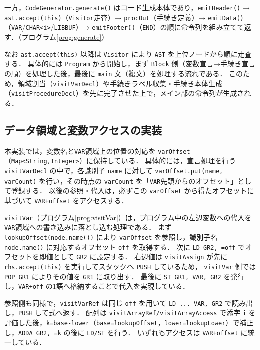 \documentclass[a4j,10pt]{jarticle}
\begin{document}
一方，\verb|CodeGenerator.generate()| はコード生成本体であり，\verb|emitHeader()| → \verb|ast.accept(this)|（\verb|Visitor|走査）→ \verb|procOut|（手続き定義）→ \verb|emitData()|（\texttt{VAR}/\texttt{CHAR<i>}/\texttt{LIBBUF}）→ \verb|emitFooter()|（\verb|END|）の順に命令列を組み立てて返す．（プログラム\ref{prog:generate}）

なお \verb|ast.accept(this)| 以降は \verb|Visitor| により \verb|AST| を上位ノードから順に走査する．
具体的には \verb|Program| から開始し，まず \verb|Block| 側（変数宣言→手続き宣言の順）を処理した後，最後に \verb|main| 文（複文）を処理する流れである．
このため，領域割当（\verb|visitVarDecl|）や手続きラベル収集・手続き本体生成（\verb|visitProcedureDecl|）を先に完了させた上で，メイン部の命令列が生成される．





\subsection{データ領域と変数アクセスの実装}
本実装では，変数名と\texttt{VAR}領域上の位置の対応を \verb|varOffset|（\verb|Map<String,Integer>|）に保持している．
具体的には，宣言処理を行う \verb|visitVarDecl| の中で，各識別子 \verb|name| に対して \verb|varOffset.put(name, varCount)| を行い，その時点の \verb|varCount| を「\texttt{VAR}先頭からのオフセット」として登録する．
以後の参照・代入は，必ずこの \verb|varOffset| から得たオフセットに基づいて \texttt{VAR+offset} をアクセスする．

\verb|visitVar|（プログラム\ref{prog:visitVar}）は，プログラム中の左辺変数への代入を\texttt{VAR}領域への書き込みに落とし込む処理である．
まず \verb|lookupOffset(node.name())| により \verb|varOffset| を参照し，識別子名 \verb|node.name()| に対応するオフセット \verb|off| を取得する．
次に \verb|LD GR2, =off| でオフセットを即値として \verb|GR2| に設定する．
右辺値は \verb|visitAssign| が先に \verb|rhs.accept(this)| を実行してスタックへ \verb|PUSH| しているため，
\verb|visitVar| 側では \verb|POP GR1| によりその値を \verb|GR1| に取り出す．
最後に \verb|ST GR1, VAR, GR2| を発行し，\texttt{VAR+off} の1語へ格納することで代入を実現している．

参照側も同様で，\verb|visitVarRef| は同じ \verb|off| を用いて \verb|LD ... VAR, GR2| で読み出し，\verb|PUSH| して式へ返す．
配列は \verb|visitArrayRef/visitArrayAccess| で添字 \verb|i| を評価した後，\verb|k=base-lower|（\verb|base=lookupOffset|，\verb|lower=lookupLower|）で補正し，\verb|ADDA GR2, =k| の後に \verb|LD/ST| を行う．
いずれもアクセスは \texttt{VAR+offset} に統一している．
\end{document}
